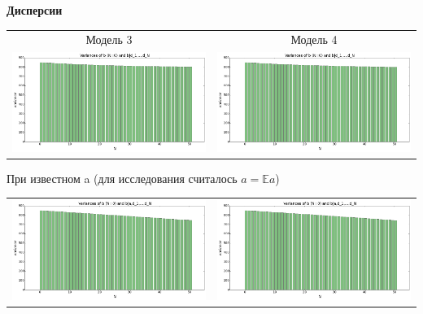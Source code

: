 \documentclass[12pt, a4paper]{article}
\begin{document}
\begin{center}
			\textbf{Дисперсии}
			\begin{tabular}{ c  c }
  				Модель 3 & Модель 4 \\
  				\includegraphics[width=8.5cm]{var_m3_d_ex.png} &
  				\includegraphics[width=8.5cm]{var_m4_d_ex.png} \\
  			\end{tabular}
  			При известном a (для исследования считалось $a = \mathbb{E}a$)
  			\begin{tabular}{ c  c }
  				\includegraphics[width=8.5cm]{var_m3_ad_ex.png} &
  				\includegraphics[width=8.5cm]{var_m4_ad_ex.png} \\
			\end{tabular}
			\end{center}
			
\end{document}

